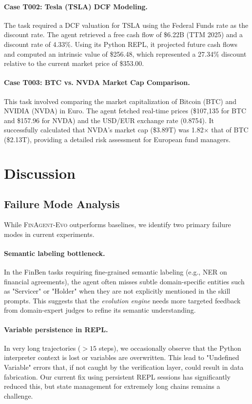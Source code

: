 \documentclass{article}
\begin{document}
\paragraph{Case T002: Tesla (TSLA) DCF Modeling.}
The task required a DCF valuation for TSLA using the Federal Funds rate as the discount rate. The agent retrieved a free cash flow of \$6.22B (TTM 2025) and a discount rate of 4.33\%. Using its Python REPL, it projected future cash flows and computed an intrinsic value of \$256.48, which represented a 27.34\% discount relative to the current market price of \$353.00.

\paragraph{Case T003: BTC vs. NVDA Market Cap Comparison.}
This task involved comparing the market capitalization of Bitcoin (BTC) and NVIDIA (NVDA) in Euro. The agent fetched real-time prices (\$107,135 for BTC and \$157.96 for NVDA) and the USD/EUR exchange rate (0.8754). It successfully calculated that NVDA's market cap (\$3.89T) was 1.82$\times$ that of BTC (\$2.13T), providing a detailed risk assessment for European fund managers.

\section{Discussion}
\subsection{Failure Mode Analysis}
While \textsc{FinAgent-Evo} outperforms baselines, we identify two primary failure modes in current experiments.

\paragraph{Semantic labeling bottleneck.}
In the FinBen tasks requiring fine-grained semantic labeling (e.g., NER on financial agreements), the agent often misses subtle domain-specific entities such as "Servicer" or "Holder" when they are not explicitly mentioned in the skill prompts. This suggests that the \emph{evolution engine} needs more targeted feedback from domain-expert judges to refine its semantic understanding.

\paragraph{Variable persistence in REPL.}
In very long trajectories ($>15$ steps), we occasionally observe that the Python interpreter context is lost or variables are overwritten. This lead to "Undefined Variable" errors that, if not caught by the verification layer, could result in data fabrication. Our current fix using persistent REPL sessions has significantly reduced this, but state management for extremely long chains remains a challenge.
\end{document}
